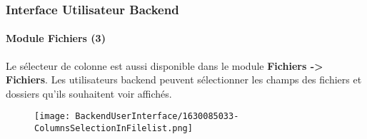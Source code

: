%

\begin{frame}[fragile]
	\frametitle{Interface Utilisateur Backend}
	\framesubtitle{Module Fichiers (3)}

	Le sélecteur de colonne est aussi disponible dans le module \textbf{Fichiers -> Fichiers}.
	Les utilisateurs backend peuvent sélectionner les champs des fichiers et dossiers qu'ils souhaitent voir affichés.

	\begin{figure}
		\texttt{[image: BackendUserInterface/1630085033-ColumnsSelectionInFilelist.png]}
	\end{figure}

\end{frame}

